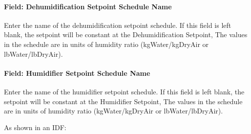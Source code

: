 \paragraph{Field: Dehumidification Setpoint Schedule Name}\label{field-dehumidification-setpoint-schedule-name}

Enter the name of the dehumidification setpoint schedule. If this field is left blank, the setpoint will be constant at the Dehumidification Setpoint, The values in the schedule are in units of humidity ratio (kgWater/kgDryAir or lbWater/lbDryAir).

\paragraph{Field: Humidifier Setpoint Schedule Name}\label{field-humidifier-setpoint-schedule-name}

Enter the name of the humidifier setpoint schedule. If this field is left blank, the setpoint will be constant at the Humidifier Setpoint, The values in the schedule are in units of humidity ratio (kgWater/kgDryAir or lbWater/lbDryAir).

As shown in an IDF:

